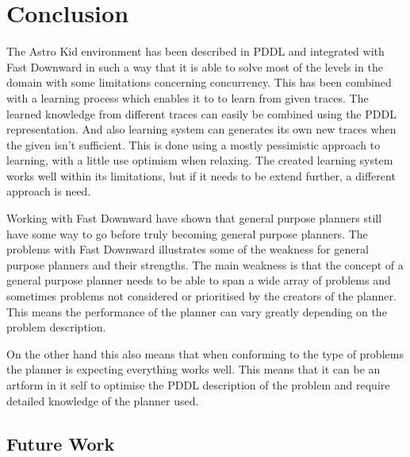 \chapter{Conclusion}

The Astro Kid environment has been described in PDDL and integrated with Fast Downward in such a way that it is able to solve most of the levels in the domain with some limitations concerning concurrency. This has been combined with a learning process which enables it to to learn from given traces. The learned knowledge from different traces can easily be combined using the PDDL representation. And also learning system can generates its own new traces when the given isn't sufficient. This is done using a mostly pessimistic approach to learning, with a little use optimism when relaxing. The created learning system works well within its limitations, but if it needs to be extend further, a different approach is need. 


Working with Fast Downward have shown that general purpose planners still have some way to go before truly becoming general purpose planners. The problems with Fast Downward illustrates some of the weakness for general purpose planners and their strengths. The main weakness is that the concept of a general purpose planner needs to be able to span a wide array of problems and sometimes problems not considered or prioritised by the creators of the planner. This means the performance of the planner can vary greatly depending on the problem description.

 
On the other hand this also means that when conforming to the type of problems the planner is expecting everything works well. This means that it can be an artform in it self to optimise the PDDL description of the problem and require detailed knowledge of the planner used.
 
 

 
 
\section{Future Work}

